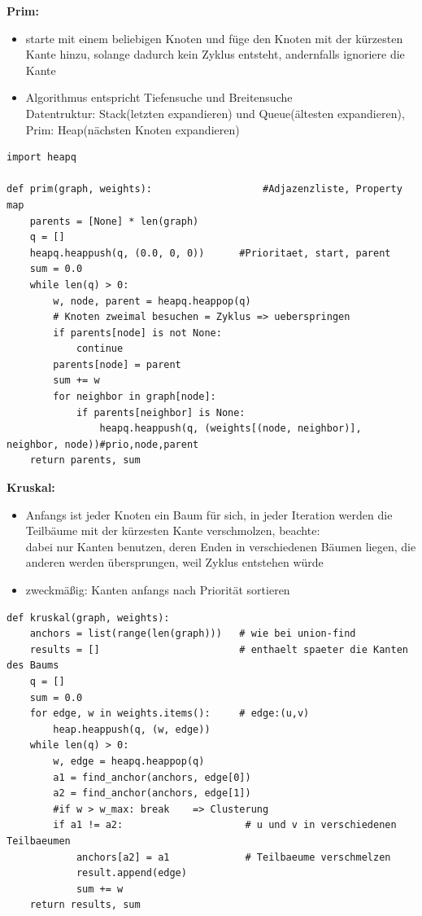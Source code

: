     \textbf{Prim:} \begin{itemize}
        \item starte mit einem beliebigen Knoten und füge den Knoten mit der kürzesten Kante hinzu, solange dadurch kein Zyklus entsteht, andernfalls ignoriere die Kante
        \item Algorithmus entspricht Tiefensuche und Breitensuche\\
        Datentruktur: Stack(letzten expandieren) und Queue(ältesten expandieren), Prim: Heap(nächsten Knoten expandieren)
    \end{itemize}

    \begin{verbatim}
import heapq

def prim(graph, weights):                   #Adjazenzliste, Property map
    parents = [None] * len(graph)
    q = []
    heapq.heappush(q, (0.0, 0, 0))      #Prioritaet, start, parent
    sum = 0.0
    while len(q) > 0:
        w, node, parent = heapq.heappop(q)
        # Knoten zweimal besuchen = Zyklus => ueberspringen
        if parents[node] is not None:
            continue
        parents[node] = parent
        sum += w
        for neighbor in graph[node]:
            if parents[neighbor] is None:
                heapq.heappush(q, (weights[(node, neighbor)], neighbor, node))#prio,node,parent
    return parents, sum
    \end{verbatim}

    \textbf{Kruskal:}
    \begin{itemize}
        \item Anfangs ist jeder Knoten ein Baum für sich, in jeder Iteration werden die Teilbäume mit der kürzesten Kante verschmolzen, beachte:\\
        dabei nur Kanten benutzen, deren Enden in verschiedenen Bäumen liegen, die anderen werden übersprungen, weil Zyklus entstehen würde
        \item zweckmäßig: Kanten anfangs nach Priorität sortieren
    \end{itemize}

    \begin{verbatim}
def kruskal(graph, weights):
    anchors = list(range(len(graph)))   # wie bei union-find
    results = []                        # enthaelt spaeter die Kanten des Baums
    q = []
    sum = 0.0
    for edge, w in weights.items():     # edge:(u,v)
        heap.heappush(q, (w, edge))
    while len(q) > 0:
        w, edge = heapq.heappop(q)
        a1 = find_anchor(anchors, edge[0])
        a2 = find_anchor(anchors, edge[1])
        #if w > w_max: break    => Clusterung
        if a1 != a2:                     # u und v in verschiedenen Teilbaeumen
            anchors[a2] = a1             # Teilbaeume verschmelzen
            result.append(edge)
            sum += w
    return results, sum
    \end{verbatim}

